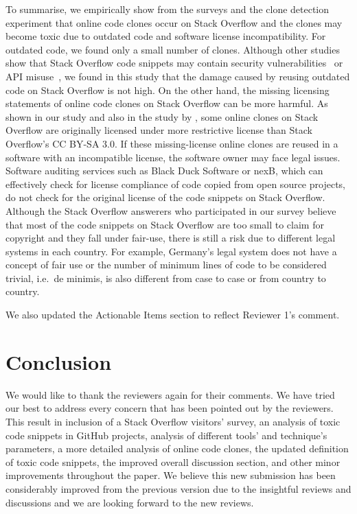 \documentclass[a4paper,twoside,10pt]{reviewresponse}
\begin{document}
To summarise, we empirically show from the surveys and the clone detection experiment that online code clones occur on Stack Overflow and the clones may become toxic due to outdated code and software license incompatibility. 
For outdated code, we found only a small number of clones. Although other studies show that Stack Overflow code snippets may contain security vulnerabilities~\citep{Acar2016,Fischer2017} or API misuse~\citep{Zhang2018}, we found in this study that the damage caused by reusing outdated code on Stack Overflow is not high. 
On the other hand, the missing licensing statements of online code clones on Stack Overflow can be more harmful. As shown in our study and also in the study by \cite{An2017}, some online clones on Stack Overflow are originally licensed under more restrictive license than Stack Overflow's CC BY-SA 3.0. If these missing-license online clones are reused in a software with an incompatible license, the software owner may face legal issues. Software auditing services such as Black Duck Software or nexB, which can effectively check for license compliance of code copied from open source projects, do not check for the original license of the code snippets on Stack Overflow. Although the Stack Overflow answerers who participated in our survey believe that most of the code snippets on Stack Overflow are too small to claim for copyright and they fall under fair-use, there is still a risk due to different legal systems in each country. For example, Germany's legal system does not have a concept of fair use or the number of minimum lines of code to be considered trivial, i.e.~de minimis, is also different from case to case or from country to country. 

We also updated the Actionable Items section to reflect Reviewer 1's comment.

\vspace{1cm}

\section{Conclusion}
We would like to thank the reviewers again for their comments.
We have tried our best to address every concern that has been pointed out by the reviewers. This result in inclusion of a Stack Overflow visitors' survey, an analysis of toxic code snippets in GitHub projects, analysis of different tools' and technique's parameters, a more detailed analysis of online code clones, the updated definition of toxic code snippets, the improved overall discussion section, and other minor improvements throughout the paper.
We believe this new submission has been considerably improved from the previous version due to the insightful reviews and discussions and we are looking forward to the new reviews.

%


\end{document}
